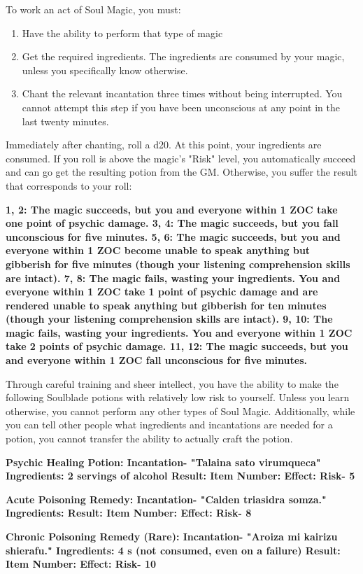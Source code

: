 \documentclass[green]{Kos}
\begin{document}
\name{\gWardSoulMagic{}}


To work an act of Soul Magic, you must:

\begin{enumerate} 
\item Have the ability to perform that type of magic
\item Get the required ingredients. The ingredients are consumed by your magic, unless you specifically know otherwise.
\item Chant the relevant incantation three times without being interrupted. You cannot attempt this step if you have been unconscious at any point in the last twenty minutes.
\end{enumerate}

Immediately after chanting, roll a d20. At this point, your ingredients are consumed. If you roll is above the magic's "Risk" level, you automatically succeed and can go get the resulting potion from the GM. Otherwise, you suffer the result that corresponds to your roll:

\bf{1, 2:} The magic succeeds, but you and everyone within 1 ZOC take one point of psychic damage.
\bf{3, 4:} The magic succeeds, but you fall unconscious for five minutes.
\bf{5, 6:} The magic succeeds, but you and everyone within 1 ZOC become unable to speak anything but gibberish for five minutes (though your listening comprehension skills are intact).
\bf{7, 8:} The magic fails, wasting your ingredients.  You and everyone within 1 ZOC take 1 point of psychic damage and are rendered unable to speak anything but gibberish for ten minutes (though your listening comprehension skills are intact).
\bf{9, 10:} The magic fails, wasting your ingredients. You and everyone within 1 ZOC take 2 points of psychic damage.
\bf{11, 12:} The magic succeeds, but you and everyone within 1 ZOC fall unconscious for five minutes.

Through careful training and sheer intellect, you have the ability to make the following Soulblade potions with relatively low risk to yourself. Unless you learn otherwise, you cannot perform any other types of Soul Magic. Additionally, while you can tell other people what ingredients and incantations are needed for a potion, you cannot transfer the ability to actually craft the potion.

\bf{Psychic Healing Potion:}
Incantation- "Talaina sato virumqueca"
Ingredients: 2 servings of alcohol
Result: \iPsychicHealthRemedy{\MYname}
Item Number: \iPsychicHealthRemedy{\MYnumber}
Effect: \iPsychicHealthRemedy{\MYtext}
Risk- 5


\bf{Acute Poisoning Remedy:}
Incantation- "Calden triasidra somza."
Ingredients: \iHerbs{\MYname}
Result: \iAcutePoisonRemedy{\MYname}
Item Number: \iAcutePoisonRemedy{\MYnumber}
Effect: \iAcutePoisonRemedy{\MYtext}
Risk- 8

\bf{Chronic Poisoning Remedy (Rare):}
Incantation- "Aroiza mi kairizu shierafu."
Ingredients: 4 \iEmerald{\MYname}s (not consumed, even on a failure)
Result: \iChronicPoisonRemedy{\MYname}
Item Number: \iChronicPoisonRemedy{\MYnumber}
Effect: \iChronicPoisonRemedy{\MYtext}
Risk- 10
\end{document}
